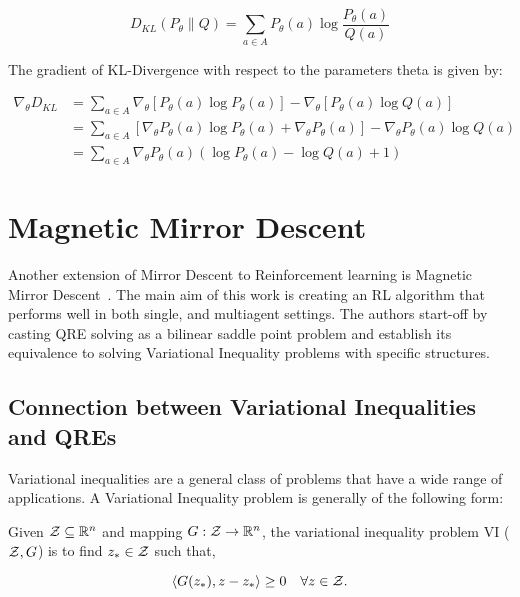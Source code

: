 $$
D_{KL}(P_{\theta} \| Q) = \sum_{a \in A} P_{\theta}(a) \log \frac{P_{\theta}(a)}{Q(a)}
$$

The gradient of KL-Divergence with respect to the parameters theta is given by:

\begin{equation*}
	\begin{split}
\nabla_{\theta} D_{KL} &= \sum_{a \in A} \nabla_{\theta} [P_{\theta}(a) \log P_{\theta}(a)] - 
						\nabla_{\theta} [P_{\theta}(a) \log Q(a)] \\
						&= \sum_{a \in A} [\nabla_{\theta} P_{\theta}(a) \log P_{\theta}(a) + \nabla_{\theta} P_{\theta}(a)] -  
						 \nabla_{\theta} P_{\theta}(a) \log Q(a) \\
						&= \sum_{a \in A} \nabla_{\theta} P_{\theta}(a) (\log P_{\theta}(a) - \log Q(a) + 1)
	\end{split}
\end{equation*}

\section[MMD]{Magnetic Mirror Descent}

Another extension of Mirror Descent to Reinforcement learning is Magnetic Mirror Descent~\cite{sokotaUnified2023}.
The main aim of this work is creating an RL algorithm that performs well in both single, and 
multiagent settings.
The authors start-off by casting QRE solving as a bilinear saddle point problem and establish its equivalence 
to solving Variational Inequality problems with specific structures.

\subsection{Connection between Variational Inequalities and QREs}

Variational inequalities are a general class of problems that have a wide range of applications.
A Variational Inequality problem is generally of the following form:

\begin{definition}
	Given $\mathcal{Z}
		\subseteq \mathbb{R}^n$ and mapping $G: \mathcal{Z} \rightarrow \mathbb{R}^n$, the variational inequality problem VI
	($\mathcal{Z}, G$) is to find $z_{\ast} \in \mathcal{Z}$ such that,

	\[ \langle G(z_{\ast}),
		z - z_{\ast} \rangle \geq 0 \quad \forall z \in \mathcal{Z}.
	\]
\end{definition}


